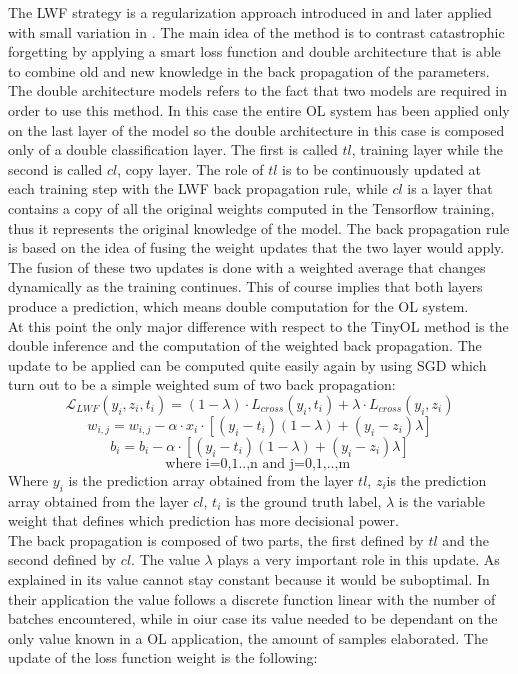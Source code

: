 \documentclass[12pt]{report}
\begin{document}
The LWF strategy is a regularization approach introduced in \cite{li2017learning} and later applied with small variation in \cite{maltoni2019continuous}. The main idea of the method is to contrast catastrophic forgetting by applying a smart loss function and double architecture that is able to combine old and new knowledge in the back propagation of the parameters. The double architecture models refers to the fact that two models are required in order to use this method. In this case the entire OL system has been applied only on the last layer of the model so the double architecture in this case is composed only of a double classification layer. The first is called $tl$, training layer while the second is called $cl$, copy layer. The role of $tl$ is to be continuously updated at each training step with the LWF back propagation rule, while $cl$ is a layer that contains a copy of all the original weights computed in the Tensorflow training, thus it represents the original knowledge of the model. The back propagation rule is based on the idea of fusing the weight updates that the two layer would apply. The fusion of these two updates is done with a weighted average that changes dynamically as the training continues. This of course implies that both layers produce a prediction, which means double computation for the OL system.\\
At this point the only major difference with respect to the TinyOL method is the double inference and the computation of the weighted back propagation. The update to be applied can be computed quite easily again by using SGD which turn out to be a simple weighted sum of two back propagation:
%
\[    \mathcal{L}_{LWF} ( y_i, z_i, t_i) =  (1-\lambda) \cdot{L}_{cross}(y_i, t_i) + \lambda \cdot{L}_{cross}(y_i, z_i) \]
\[ w_{i,j} = w_{i,j} - \alpha \cdot x_i \cdot [ (y_i - t_i)(1-\lambda) + (y_i - z_i)\lambda]  \]
\[ b_i = b_i - \alpha \cdot [ (y_i - t_i)(1-\lambda) + (y_i - z_i)\lambda] \]
\[ \text{where i=0,1..,n  and  j=0,1,..,m } \]
%
Where $y_i$ is the prediction array obtained from the layer $tl$, $z_i$is the prediction array obtained from the layer $cl$, $t_i$ is the ground truth label, $\lambda$ is the variable weight that defines which prediction has more decisional power. \\
The back propagation is composed of two parts, the first defined by $tl$ and the second defined by $cl$. The value $\lambda$ plays a very important role in this update. As explained in \cite{maltoni2019continuous} its value cannot stay constant because it would be suboptimal. In their application the value follows a discrete function linear with the number of batches encountered, while in oiur case its value needed to be dependant on the only value known in a OL application, the amount of samples elaborated. The update of the loss function weight is the following:
\end{document}
